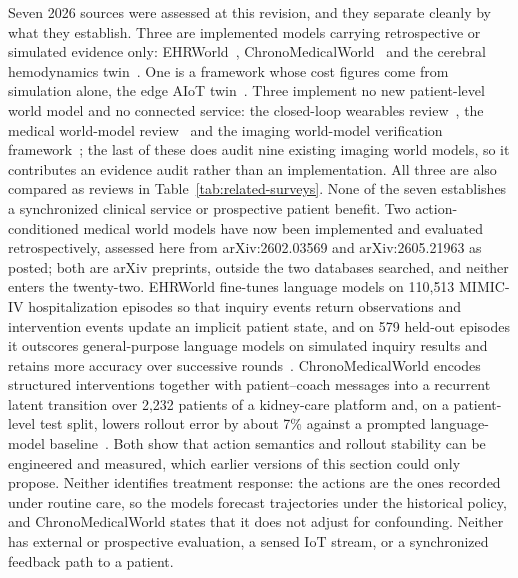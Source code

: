 \documentclass[journal]{IEEEtran}
\begin{document}
Seven 2026 sources were assessed at this revision, and they separate cleanly by what they establish. Three are implemented models carrying retrospective or simulated evidence only: EHRWorld~\cite{mu2026ehrworld}, ChronoMedicalWorld~\cite{wang2026chronomedicalworld} and the cerebral hemodynamics twin~\cite{briggs2026cerebral}. One is a framework whose cost figures come from simulation alone, the edge AIoT twin~\cite{jun2026aiottwin}. Three implement no new patient-level world model and no connected service: the closed-loop wearables review~\cite{gao2026closedloop}, the medical world-model review~\cite{chen2026medicalwm} and the imaging world-model verification framework~\cite{wimalasiri2026verifiable}; the last of these does audit nine existing imaging world models, so it contributes an evidence audit rather than an implementation. All three are also compared as reviews in Table~\ref{tab:related-surveys}. None of the seven establishes a synchronized clinical service or prospective patient benefit. Two action-conditioned medical world models have now been implemented and evaluated retrospectively, assessed here from arXiv:2602.03569 and arXiv:2605.21963 as posted; both are arXiv preprints, outside the two databases searched, and neither enters the twenty-two. EHRWorld fine-tunes language models on 110{,}513 MIMIC-IV hospitalization episodes so that inquiry events return observations and intervention events update an implicit patient state, and on 579 held-out episodes it outscores general-purpose language models on simulated inquiry results and retains more accuracy over successive rounds~\cite{mu2026ehrworld}. ChronoMedicalWorld encodes structured interventions together with patient--coach messages into a recurrent latent transition over 2{,}232 patients of a kidney-care platform and, on a patient-level test split, lowers rollout error by about 7\% against a prompted language-model baseline~\cite{wang2026chronomedicalworld}. Both show that action semantics and rollout stability can be engineered and measured, which earlier versions of this section could only propose. Neither identifies treatment response: the actions are the ones recorded under routine care, so the models forecast trajectories under the historical policy, and ChronoMedicalWorld states that it does not adjust for confounding. Neither has external or prospective evaluation, a sensed IoT stream, or a synchronized feedback path to a patient.
\end{document}
